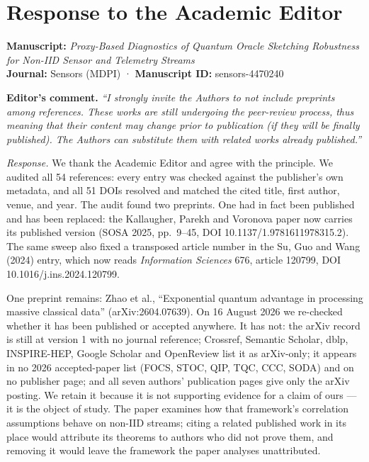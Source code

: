 \documentclass[
  11pt,
]{article}
\author{}
\date{}
\begin{document}
\section{Response to the Academic
Editor}\label{response-to-the-academic-editor}

\textbf{Manuscript:} \emph{Proxy-Based Diagnostics of Quantum Oracle
Sketching Robustness for Non-IID Sensor and Telemetry Streams}\\
\textbf{Journal:} Sensors (MDPI) · \textbf{Manuscript ID:}
sensors-4470240

\textbf{Editor's comment.} \emph{``I strongly invite the Authors to not
include preprints among references. These works are still undergoing the
peer-review process, thus meaning that their content may change prior to
publication (if they will be finally published). The Authors can
substitute them with related works already published.''}

\emph{Response.} We thank the Academic Editor and agree with the
principle. We audited all 54 references: every entry was checked against
the publisher's own metadata, and all 51 DOIs resolved and matched the
cited title, first author, venue, and year. The audit found two
preprints. One had in fact been published and has been replaced: the
Kallaugher, Parekh and Voronova paper now carries its published version
(SOSA 2025, pp.~9--45, DOI 10.1137/1.9781611978315.2). The same sweep
also fixed a transposed article number in the Su, Guo and Wang (2024)
entry, which now reads \emph{Information Sciences} 676, article 120799,
DOI 10.1016/j.ins.2024.120799.

One preprint remains: Zhao et al., ``Exponential quantum advantage in
processing massive classical data'' (arXiv:2604.07639). On 16 August
2026 we re-checked whether it has been published or accepted anywhere.
It has not: the arXiv record is still at version 1 with no journal
reference; Crossref, Semantic Scholar, dblp, INSPIRE-HEP, Google Scholar
and OpenReview list it as arXiv-only; it appears in no 2026
accepted-paper list (FOCS, STOC, QIP, TQC, CCC, SODA) and on no
publisher page; and all seven authors' publication pages give only the
arXiv posting. We retain it because it is not supporting evidence for a
claim of ours --- it is the object of study. The paper examines how that
framework's correlation assumptions behave on non-IID streams; citing a
related published work in its place would attribute its theorems to
authors who did not prove them, and removing it would leave the
framework the paper analyses unattributed.
\end{document}

